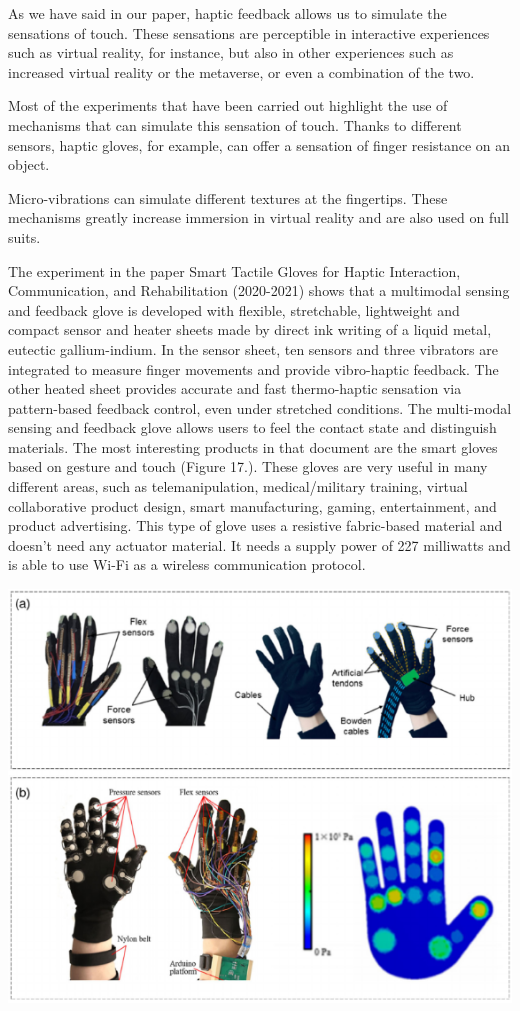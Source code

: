 \documentclass[12pt, a4paper]{article}
\begin{document}
\begin{multicols}{2}
As we have said in our paper, haptic feedback allows us to simulate the sensations of touch. These sensations are perceptible in interactive experiences such as virtual reality, for instance, but also in other experiences such as increased virtual reality or the metaverse, or even a combination of the two. 

Most of the experiments that have been carried out highlight the use of mechanisms that can simulate this sensation of touch. Thanks to different sensors, haptic gloves, for example, can offer a sensation of finger resistance on an object\cite{hapticglove}.

Micro-vibrations can simulate different textures at the fingertips\cite{hapticaptor}. These mechanisms greatly increase immersion in virtual reality and are also used on full suits\cite{hapticsuit}. 

The experiment in the paper Smart Tactile Gloves for Haptic Interaction, Communication, and Rehabilitation (2020-2021)  shows that a multimodal sensing and feedback glove is developed with flexible, stretchable, lightweight and compact sensor and heater sheets made by direct ink writing of a liquid metal, eutectic gallium-indium. In the sensor sheet, ten sensors and three vibrators are integrated to measure finger movements and provide vibro-haptic feedback. The other heated sheet provides accurate and fast thermo-haptic sensation via pattern-based feedback control, even under stretched conditions. The multi-modal sensing and feedback glove allows users to feel the contact state and distinguish materials\cite{hapticglove1}. 
The most interesting products in that document are the smart gloves based on gesture and touch (Figure 17.). These gloves are very useful in many different areas, such as telemanipulation, medical/military training, virtual collaborative product design, smart manufacturing, gaming, entertainment, and product advertising. This type of glove uses a resistive fabric-based material and doesn’t need any actuator material. It needs a supply power of 227 milliwatts and is able to use Wi-Fi as a wireless communication protocol\cite{hapticglove1}.

\vspace*{3mm}
\captionsetup{type=figure}
\includegraphics[width=.49\textwidth]{gloves-gesture-touch.png}
\vspace*{3mm}


\end{multicols}
\end{document}
